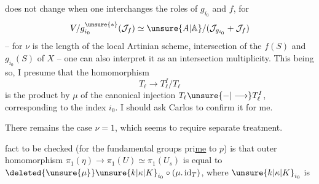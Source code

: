 does not change when one interchanges the roles of $g_{i_0}$ and $f$, for
\[
V/g_{i_0}^{\unsure{*}}(\mathcal J_f)\simeq\unsure{A|\mathbb A}/(\mathcal J_{g_{i_0}}+\mathcal J_f)
\]
-- for $\nu$ is the length of the local Artinian scheme, intersection of the  $f(S)$ and $g_{i_0}(S)$ of $X$ -- one can also interpret it as an intersection multiplicity. This being so, I presume that the homomorphism
\[
T_\ell\longrightarrow T_\ell^I/T_\ell
\]
is the product by $\mu$ of the canonical injection $T_\ell\unsure{-|\longrightarrow}T_\ell^I$, corresponding to the index $i_0$. I should ask Carlos to confirm it for me.

There remains the case $\nu=1$, which seems to require separate treatment.

 fact to be checked (for the fundamental groups pri\uline{me} to $p$) is that  outer homomorphism $\pi_1(\eta)\longrightarrow\pi_1(U)\simeq\pi_1(U_s)$ is equal to $\deleted{\unsure{\mu}}\unsure{k|\kappa|K}_{i_0}\circ(\mu.\operatorname{id}_T)$, where $\unsure{k|\kappa|K}_{i_0}$ is
